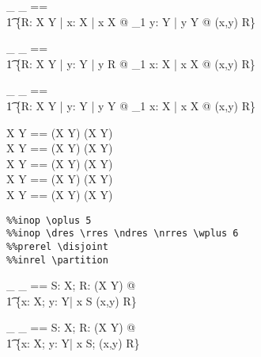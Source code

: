 \documentclass{article}
\begin{document}
\begin{axdef}[X,Y]
  \_ \fun \_ == \\\t1
    \{R: \assumed X \rel Y | 
         \forall x: \assumed X | x \in X @ \exists_1 y: \assumed Y | y \in Y
          @ (x,y) \in R\}
\end{axdef}

\begin{axdef}[X,Y]
  \_ \pinj \_ == \\\t1
    \{R: \assumed X \rel Y | 
         \forall y: \assumed Y | y \in \ran R @ 
                \exists_1 x: \assumed X | x \in X @ (x,y) \in R\}
\end{axdef}

\begin{axdef}[X,Y]
  \_ \psurj \_ == \\\t1
    \{R: \assumed X \rel Y | 
         \forall y: \assumed Y | y \in Y @ 
                \exists_1 x: \assumed X | x \in X @ (x,y) \in R\}
\end{axdef}

\begin{zed}
  X \surj Y == (X \psurj Y) \cap (X \fun Y) \\
  X \inj  Y == (X \pinj Y) \cap (X \fun Y) \\
  X \bij  Y == (X \inj Y) \cap (X \surj Y) \\
  X \ffun Y == (X \pfun Y) \cap \finset(X \cross Y) \\
  X \finj Y == (X \pinj Y) \cap (X \ffun Y)
\end{zed}



\begin{verbatim}
%%inop \oplus 5
%%inop \dres \rres \ndres \nrres \wplus 6
%%prerel \disjoint 
%%inrel \partition 
\end{verbatim}

\begin{axdef}[X,Y]
  \_ \dres \_ == 
      \lambda S: \assumed \power X; R: \assumed (X \rel Y) @ \\\t1
        \{x: \assumed X; y: \assumed Y| x \in S \land (x,y) \in R\}
\end{axdef}

\begin{axdef}[X,Y]
  \_ \ndres \_ == 
      \lambda S: \assumed \power X; R: \assumed (X \rel Y) @ \\\t1
        \{x: \assumed X; y: \assumed Y| \lnot x \in S; (x,y) \in R\}
\end{axdef}
\end{document}
